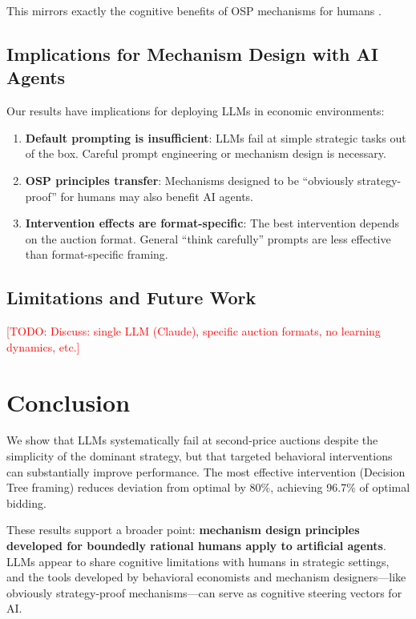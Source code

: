 \documentclass[12pt]{article}
\newcommand{\todo}[1]{\textcolor{red}{[TODO: #1]}}
\begin{document}
This mirrors exactly the cognitive benefits of OSP mechanisms for humans \citep{li2017obviously}.

\subsection{Implications for Mechanism Design with AI Agents}

Our results have implications for deploying LLMs in economic environments:

\begin{enumerate}
    \item \textbf{Default prompting is insufficient}: LLMs fail at simple strategic tasks out of the box. Careful prompt engineering or mechanism design is necessary.

    \item \textbf{OSP principles transfer}: Mechanisms designed to be ``obviously strategy-proof'' for humans may also benefit AI agents.

    \item \textbf{Intervention effects are format-specific}: The best intervention depends on the auction format. General ``think carefully'' prompts are less effective than format-specific framing.
\end{enumerate}

\subsection{Limitations and Future Work}

\todo{Discuss: single LLM (Claude), specific auction formats, no learning dynamics, etc.}

\section{Conclusion}

We show that LLMs systematically fail at second-price auctions despite the simplicity of the dominant strategy, but that targeted behavioral interventions can substantially improve performance. The most effective intervention (Decision Tree framing) reduces deviation from optimal by 80\%, achieving 96.7\% of optimal bidding.

These results support a broader point: \textbf{mechanism design principles developed for boundedly rational humans apply to artificial agents}. LLMs appear to share cognitive limitations with humans in strategic settings, and the tools developed by behavioral economists and mechanism designers---like obviously strategy-proof mechanisms---can serve as cognitive steering vectors for AI.
\end{document}
